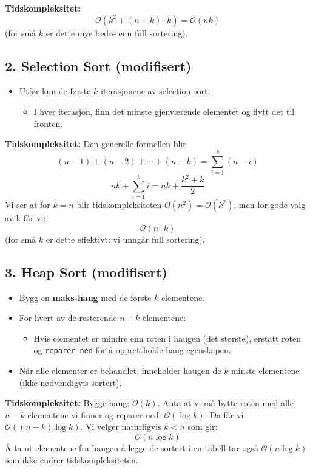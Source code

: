 \documentclass[12pt]{article}
\begin{document}
\noindent
\textbf{Tidskompleksitet:} 
\[
\mathcal{O}(k^2 + (n-k) \cdot k) = \mathcal{O}(nk)
\]
(for små $k$ er dette mye bedre enn full sortering).

\subsection*{2. Selection Sort (modifisert)}

\begin{itemize}
  \item Utfør kun de første $k$ iterasjonene av selection sort:
  \begin{itemize}
    \item I hver iterasjon, finn det minste gjenværende elementet og 
    flytt det til fronten.
  \end{itemize}
\end{itemize}

\noindent
\textbf{Tidskompleksitet:}
Den generelle formellen blir 
\[ 
    (n-1) + (n-2) + \cdots + (n-k) = \displaystyle\sum_{i=1}^{k}(n-i) 
\]
\[ 
    nk + \displaystyle\sum_{i=1}^{k}i = nk + \frac{k^2 + k}{2}
\]
Vi ser at for \(k=n\) blir tidskompleksiteten 
\(\mathcal O (n^2) = \mathcal O(k^2)\), men for gode valg av k 
får vi:
\[
\mathcal{O}(n \cdot k)
\]
(for små $k$ er dette effektivt; vi unngår full sortering).

\subsection*{3. Heap Sort (modifisert)}

\begin{itemize}
  \item Bygg en \textbf{maks-haug} med de første $k$ elementene.
  \item For hvert av de resterende $n-k$ elementene:
  \begin{itemize}
    \item Hvis elementet er mindre enn roten i haugen (det største), 
    erstatt roten og \texttt{reparer ned} for å opprettholde haug-egenskapen.
  \end{itemize}
  \item Når alle elementer er behandlet, inneholder haugen de $k$ minste 
  elementene (ikke nødvendigvis sortert).
\end{itemize}

\noindent
\textbf{Tidskompleksitet:}
Bygge haug: \(\mathcal O(k)\). Anta at vi må bytte roten med alle \(n-k\) 
elementene vi finner og reparer ned: \(\mathcal O(\log k)\).
Da får vi \(\mathcal O((n-k)\log k)\). Vi velger naturligvis \(k < n\) som gir:
\[
    \mathcal{O}(n \log k)
\]
Å ta ut elementene fra haugen å legge de sortert i en tabell tar også 
\(\mathcal O(n\log k)\) som ikke endrer tidskompleksiteten.
\end{document}
